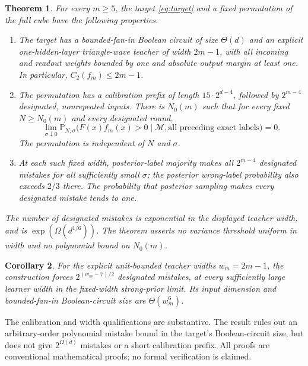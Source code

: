 \documentclass[11pt]{article}
\newtheorem{theorem}{Theorem}
\newtheorem{corollary}[theorem]{Corollary}
\newcommand{\Pp}{\mathbb P}
\begin{document}
\begin{theorem}\label{thm:main}
For every $m\ge5$, the target \eqref{eq:target} and a fixed permutation
of the full cube have the following properties.
\begin{enumerate}
\item The target has a bounded-fan-in Boolean circuit of size
$\Theta(d)$ and an explicit one-hidden-layer triangle-wave teacher of
width $2m-1$, with all incoming and readout weights bounded by one and
absolute output margin at least one.
In particular, $C_2(f_m)\le2m-1$.
\item The permutation has a calibration prefix of length
$15\cdot2^{d-4}$, followed by $2^{m-4}$ designated, nonrepeated inputs.
There is $N_0(m)$ such that for every fixed $N\ge N_0(m)$ and every
designated round,
\begin{equation}\label{eq:posteriorlimit}
 \lim_{\sigma\downarrow0}
 \Pp_{N,\sigma}\bigl(F(x)f_m(x)>0\mid\mathcal M,
       \text{all preceding exact labels}\bigr)=0.
\end{equation}
The permutation is independent of $N$ and $\sigma$.
\item At each such fixed width, posterior-label majority makes all
$2^{m-4}$ designated mistakes for all sufficiently small $\sigma$;
the posterior wrong-label probability also exceeds $2/3$ there.
The probability that posterior sampling makes every designated mistake
tends to one.
\end{enumerate}
The number of designated mistakes is exponential in the displayed
teacher width, and is $\exp(\Omega(d^{1/6}))$. The theorem asserts no
variance threshold uniform in width and no polynomial bound on $N_0(m)$.
\end{theorem}

\begin{corollary}\label{cor:width}
For the explicit unit-bounded teacher widths $w_m=2m-1$, the construction
forces $2^{(w_m-7)/2}$ designated mistakes, at every sufficiently large
learner width in the fixed-width strong-prior limit. Its input dimension
and bounded-fan-in Boolean-circuit size are $\Theta(w_m^6)$.
\end{corollary}

The calibration and width qualifications are substantive. The result
rules out an arbitrary-order polynomial mistake bound in the target's
Boolean-circuit size, but does not give $2^{\Omega(d)}$ mistakes or a
short calibration prefix. All proofs are conventional mathematical
proofs; no formal verification is claimed.
\end{document}
